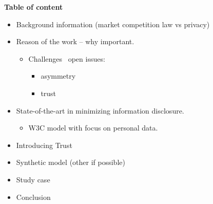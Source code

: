 \documentclass[runningheads,a4paper]{llncs}
\begin{document}
\textbf{Table of content}
\begin{itemize}
    \item Background information (market competition law vs privacy)
    \item Reason of the work – why important.
        \begin{itemize}
            \item Challenges \ open issues:
                \begin{itemize}
                    \item asymmetry
                    \item trust
                \end{itemize}
        \end{itemize}
    \item State-of-the-art in minimizing information disclosure.
        \begin{itemize}
            \item W3C model with focus on personal data.
        \end{itemize}
    \item Introducing Trust
    \item Synthetic model (other if possible)
    \item Study case
    \item Conclusion
\end{itemize}



\end{document}
